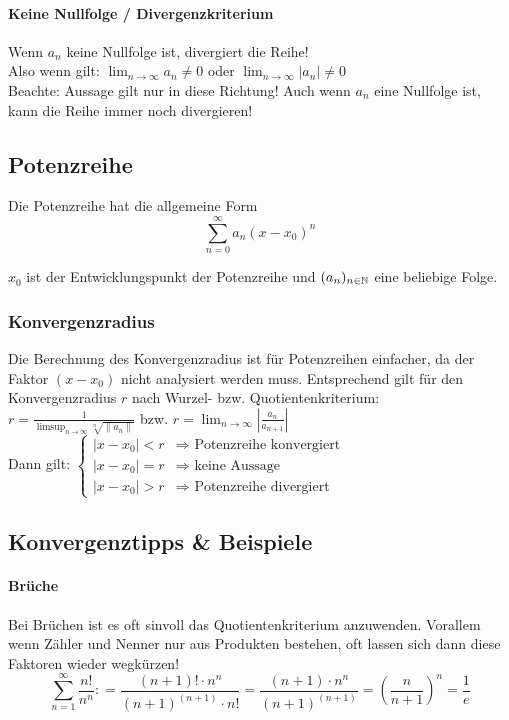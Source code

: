 \paragraph{Keine Nullfolge / Divergenzkriterium}
Wenn $a_n$ keine Nullfolge ist, divergiert die Reihe! \\
Also wenn gilt: $\lim_{n \to \infty} a_n \neq 0$ oder $\lim_{n \to \infty} |a_n| \neq 0$ \\
Beachte: Aussage gilt nur in diese Richtung! Auch wenn $a_n$ eine Nullfolge ist, kann die Reihe immer noch divergieren!

\subsection{Potenzreihe}
Die Potenzreihe hat die allgemeine Form
\[
\sum_{n=0}^\infty a_n (x - x_0)^n
\]

$x_0$ ist der Entwicklungspunkt der Potenzreihe und $(a_n)_{n \in \mathbb{N}}$ eine
beliebige Folge.

\subsubsection{Konvergenzradius}
Die Berechnung des Konvergenzradius ist für Potenzreihen einfacher, da der
Faktor $(x - x_0)$ nicht analysiert werden muss. Entsprechend gilt für den
Konvergenzradius $r$ nach Wurzel- bzw. Quotientenkriterium:\\
$r = \frac{1}{\limsup_{n\to\infty} \sqrt[n]{\|a_n\|}}$ bzw.
$r = \lim_{n\to\infty} \left | \frac{a_n}{a_{n+1}} \right |$ \\
Dann gilt:
$
\begin{cases}
	|x - x_0| < r & \Rightarrow \text{ Potenzreihe konvergiert} \\
	|x - x_0| = r & \Rightarrow \text{ keine Aussage}\\
	|x - x_0| > r & \Rightarrow \text{ Potenzreihe divergiert}
\end{cases}
$

\subsection{Konvergenztipps \& Beispiele}
\paragraph{Brüche}
Bei Brüchen ist es oft sinvoll das Quotientenkriterium anzuwenden. Vorallem wenn Zähler und Nenner nur aus Produkten bestehen, oft lassen sich dann diese Faktoren wieder wegkürzen!
\[
	\sum_{n=1}^\infty \frac{n!}{n^n}: = \frac{(n+1)! \cdot n^n}{(n+1)^{(n+1)} \cdot n!} 
	= \frac{(n+1) \cdot n^n}{(n+1)^{(n+1)}} = \left( \frac{n}{n+1} \right)^n = \frac{1}{e}
\]

